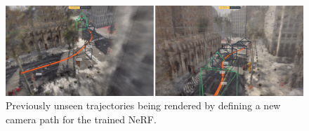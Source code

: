 \begin{figure}[h]
    \centering
    \includegraphics[width=1.0\textwidth]{figures/unseen-trajectories.png}
    \caption{Previously unseen trajectories being rendered by defining a new camera path for the trained NeRF.}
    \label{fig:unseen-trajectories}
\end{figure}